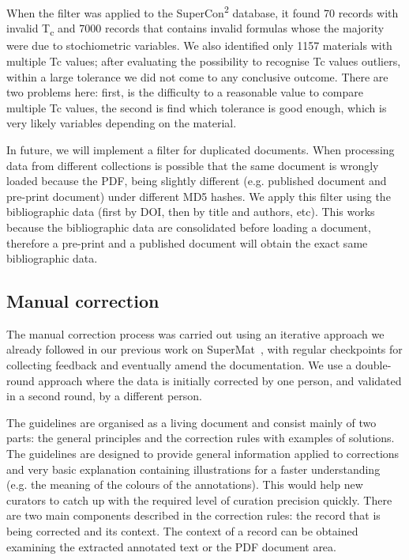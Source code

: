 \documentclass[a4paper]{article}
\begin{document}
When the filter was applied to the SuperCon\textsuperscript{2} database, it found 70 records with invalid T\textsubscript{c} and 7000 records that contains invalid formulas whose the majority were due to stochiometric variables. We also identified only 1157 materials with multiple Tc values; after evaluating the possibility to recognise Tc values outliers, within a large tolerance we did not come to any conclusive outcome. 
There are two problems here: first, is the difficulty to a reasonable value to compare multiple Tc values, the second is find which tolerance is good enough, which is very likely variables depending on the material. 



In future, we will implement a filter for duplicated documents. 
When processing data from different collections is possible that the same document is wrongly loaded because the PDF, being slightly different (e.g. published document and pre-print document) under different MD5 hashes.  
We apply this filter using the bibliographic data (first by DOI, then by title and authors, etc). This works because the bibliographic data are consolidated before loading a document, therefore a pre-print and a published document will obtain the exact same bibliographic data.


\subsection{Manual correction}
\label{subsec:manual_correction}
The manual correction process was carried out using an iterative approach we already followed in our previous work on SuperMat~\cite{foppiano2021supermat}, with regular checkpoints for collecting feedback and eventually amend the documentation.
We use a double-round approach where the data is initially corrected by one person, and validated in a second round, by a different person. 

The guidelines are organised as a living document and consist mainly of two parts: the general principles and the correction rules with examples of solutions.
The guidelines are designed to provide general information applied to corrections and very basic explanation containing illustrations for a faster understanding (e.g. the meaning of the colours of the annotations). This would help new curators to catch up with the required level of curation precision quickly. 
There are two main components described in the correction rules: the record that is being corrected and its context. 
The context of a record can be obtained examining the extracted annotated text or the PDF document area.
\end{document}
